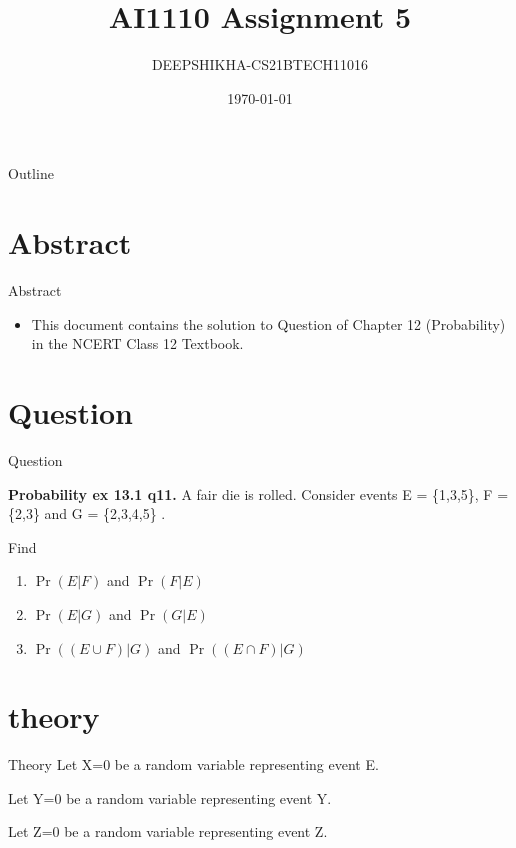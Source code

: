 \documentclass{beamer}
\title{AI1110 Assignment 5}
\author{DEEPSHIKHA-CS21BTECH11016}
\date{\today}
\providecommand{\pr}[1]{\ensuremath{\Pr\left(#1\right)}}
\begin{document}
\begin{frame}
		\titlepage
	\end{frame}

\begin{frame}{Outline}
  \tableofcontents
\end{frame}
\section{Abstract}
	\begin{frame}{Abstract}
		\begin{itemize}
			\item 	This document contains the solution to Question of Chapter 12 (Probability) in the NCERT Class 12 Textbook.
		\end{itemize}
	\end{frame}
	
	
	\section{Question}
	\begin{frame}{Question}
		\begin{block}{\textbf{Probability  ex 13.1 q11.}}
			 A fair die is rolled. Consider events E = \{1,3,5\}, F = \{2,3\} and G = \{2,3,4,5\} .
	
	Find
	\begin{enumerate}
	\item \pr{E|F} and \pr{F|E}
	\item \pr{E|G} and \pr{G|E}
	\item \pr{(E \cup F)|G} and \pr{(E \cap F)|G}
	\end{enumerate}	 
		\end{block}
	
	\end{frame}
	
\section{theory}
\begin{frame}{Theory}
	Let X=0 be a random variable representing event E.
	
	
	Let Y=0 be a random variable representing event Y.
	
	
	Let Z=0 be a random variable representing event Z.
	    
\end{frame}

	
\end{document}
